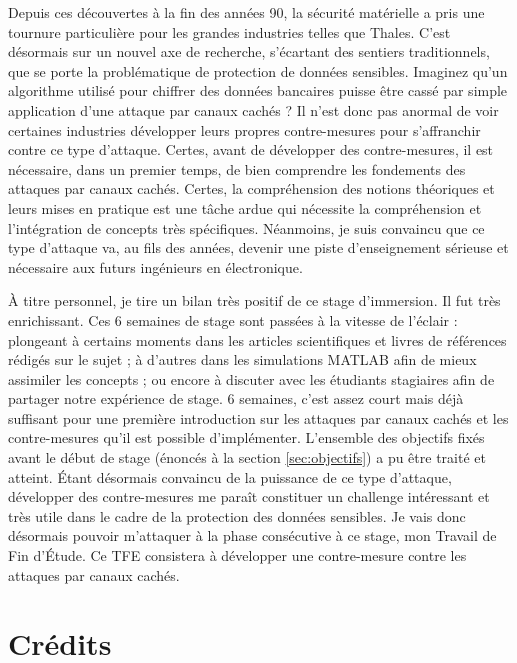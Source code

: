 \documentclass[10pt, oneside, a4paper]{article}
\begin{document}
Depuis ces découvertes à la fin des années 90, la sécurité matérielle a pris une tournure particulière pour les grandes industries telles que Thales. C'est désormais sur un nouvel axe de recherche, s'écartant des sentiers traditionnels, que se porte la problématique de protection de données sensibles. Imaginez qu'un algorithme utilisé pour chiffrer des données bancaires puisse être cassé par simple application d'une attaque par canaux cachés ? Il n'est donc pas anormal de voir certaines industries développer leurs propres contre-mesures pour s'affranchir contre ce type d'attaque. Certes, avant de développer des contre-mesures, il est nécessaire, dans un premier temps, de bien comprendre les fondements des attaques par canaux cachés. Certes, la compréhension des notions théoriques et leurs mises en pratique est une tâche ardue qui nécessite la compréhension et l'intégration de concepts très spécifiques. Néanmoins, je suis convaincu que ce type d'attaque va, au fils des années, devenir une piste d'enseignement sérieuse et nécessaire aux futurs ingénieurs en électronique.

À titre personnel, je tire un bilan très positif de ce stage d'immersion. Il fut très enrichissant. Ces 6 semaines de stage sont passées à la vitesse de l'éclair : plongeant à certains moments dans les articles scientifiques et livres de références rédigés sur le sujet ; à d'autres dans les simulations MATLAB afin de mieux assimiler les concepts ; ou encore à discuter avec les étudiants stagiaires afin de partager notre expérience de stage. 6 semaines, c'est assez court mais déjà suffisant pour une première introduction sur les attaques par canaux cachés et les contre-mesures qu'il est possible d'implémenter. L'ensemble des objectifs fixés avant le début de stage (énoncés à la section \ref{sec:objectifs}) a pu être traité et atteint. Étant désormais convaincu de la puissance de ce type d'attaque, développer des contre-mesures me paraît constituer un challenge intéressant et très utile dans le cadre de la protection des données sensibles. Je vais donc désormais pouvoir m'attaquer à la phase consécutive à ce stage, mon Travail de Fin d'Étude. Ce TFE consistera à développer une contre-mesure contre les attaques par canaux cachés.




\newpage
\section*{Crédits}
\end{document}

